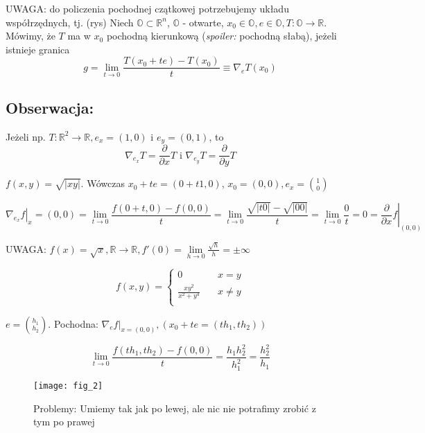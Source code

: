 \documentclass[../main.tex]{subfiles}
\begin{document}
UWAGA: do policzenia pochodnej czątkowej potrzebujemy układu współrzędnych, tj. (rys)
\vspace{0.3cm}
Niech $\mathbb{O}\subset\mathbb{R}^{n}$, $\mathbb{O}$ - otwarte, $x_0\in\mathbb{O},e\in\mathbb{O},T:\mathbb{O}\to\mathbb{R}$.\\
Mówimy, że $T$ ma w $x_0$ pochodną kierunkową (\textit{spoiler:} pochodną słabą), jeżeli istnieje granica $$g = \lim\limits_{t \to 0}\frac{T(x_0 +te) - T(x_0)}{t} \equiv \nabla_e T(x_0)$$
\subsection{
    Obserwacja:
}
Jeżeli np. $T: \mathbb{R}^{2}\to\mathbb{R}, e_x=(1,0)$ i $e_y = (0,1)$, to $$\nabla_{e_{x}} T = \frac{\partial}{\partial x} T \text{ i } \nabla_{e_{y}} T = \frac{\partial}{\partial y} T$$

\begin{przyklad}

\end{przyklad}
$f(x,y) = \sqrt{|xy|}$. Wówczas $x_0 + te = (0+t1,0)$, $x_0 = (0,0), e_x = \binom{1}{0}$

$$\left. \nabla_{e_x} f \right |_x=(0,0) = \lim\limits_{t \to 0}\frac{f(0+t,0) - f(0,0)}{t} = \lim\limits_{t \to 0}\frac{\sqrt{|t 0|} - \sqrt{|0 0|}}{t} = \lim\limits_{t \to 0}\frac{0}{t} = 0 = \left. \frac{\partial}{\partial x} f\right |_{(0,0)}$$

UWAGA: $f(x) = \sqrt{x}, \mathbb{R}\to\mathbb{R}, f'(0) = \lim\limits_{h \to 0}\frac{\sqrt{h}}{h} = \pm \infty$

\[ f(x,y) =
\begin{cases}
    0 & \quad x=y\\
    \frac{xy^2}{x^2+y^4} & \quad x \neq y\\
\end{cases}
\]

$e = \binom{h_1}{h_2}$. Pochodna: $\left. \nabla_e f\right |_{x=(0,0)}, (x_0 + te = (th_1, th_2))$

$$\lim\limits_{t \to 0}\frac{f(th_1, th_2) - f(0,0)}{t} = \frac{h_1 h_2^2}{h_1^2} = \frac{h_2^2}{h_1}$$

\begin{figure}
    \centering
    \texttt{[image: fig\_2]}
    \caption{Problemy: Umiemy tak jak po lewej, ale nic nie potrafimy zrobić z tym po prawej}
    \label{fig:fig_2}
\end{figure}
\end{document}

